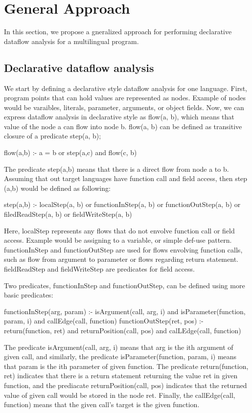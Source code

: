\section{General Approach}

In this section, we propose a gneralized approach for performing declarative
dataflow analysis for a multilingual program.

\subsection{Declarative dataflow analysis}

We start by defining a declarative style dataflow analysis for one language.
First, program points that can hold values are represented as nodes. Example of
nodes would be varaibles, literals, parameter, arguments, or object fields.
Now, we can express dataflow analysis in declarative style as flow(a, b), which
means that value of the node a can flow into node b. flow(a, b) can be defined
as transitive closure of a predicate step(a, b);

flow(a,b) :- a = b or step(a,c) and flow(c, b)

The predicate step(a,b) means that there is a direct flow from node a to b. Assuming that
out target languages have function call and field access, then step (a,b) would be
defined as following:

step(a,b) :- localStep(a, b) or functionInStep(a, b) or functionOutStep(a, b)
or filedReadStep(a, b) or fieldWriteStep(a, b)

Here, localStep represents any flows that do not envolve function call or field
access.  Example would be assigning to a variable, or simple def-use pattern.
functionInStep and functionOutStep are used for flows envolving function calls,
such as flow from argument to parameter or flows regarding return statement.
fieldReadStep and fieldWriteStep are predicates for field access.

Two predicates, functionInStep and functionOutStep, can be defined using more basic predicates:

functionInStep(arg, param) :- isArgument(call, arg, i) and isParameter(function, param, i) and callEdge(call, function)
functionOutStep(ret, pos) :- return(function, ret) and returnPosition(call, pos) and calLEdge(call, function)

The predicate isArgument(call, arg, i) means that arg is the ith argument of
given call, and similarly, the predicate isParameter(function, param, i) means
that param is the ith parameter of given function.  The predicate
return(function, ret) indicates that there is a return statement returning the
value ret in given function, and the prediacate returnPosition(call, pos)
indicates that the returned value of given call would be stored in the node
ret.  Finally, the callEdge(call, function) means that the given call's target
is the given function.

